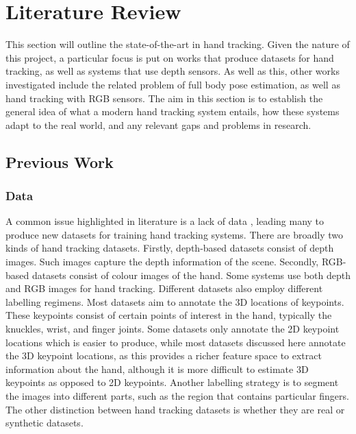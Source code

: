 \chapter{Literature Review}
\label{chap:lit}


This section will outline the state-of-the-art in hand tracking. Given the nature of this project, a particular focus is put on works that produce datasets for hand tracking, as well as systems that use depth sensors. As well as this, other works investigated include the related problem of full body pose estimation, as well as hand tracking with RGB sensors. The aim in this section is to establish the general idea of what a modern hand tracking system entails, how these systems adapt to the real world, and any relevant gaps and problems in research.

\section{Previous Work}
\subsection{Data}
A common issue highlighted in literature is a lack of data \cite{armagan2020measuring}, leading many to produce new datasets for training hand tracking systems. There are broadly two kinds of hand tracking datasets. Firstly, depth-based datasets consist of depth images. Such images capture the depth information of the scene. Secondly, RGB-based datasets consist of colour images of the hand. Some systems use both depth and RGB images for hand tracking. Different datasets also employ different labelling regimens. Most datasets aim to annotate the 3D locations of keypoints. These keypoints consist of certain points of interest in the hand, typically the knuckles, wrist, and finger joints. Some datasets only annotate the 2D keypoint locations which is easier to produce, while most datasets discussed here annotate the 3D keypoint locations, as this provides a richer feature space to extract information about the hand, although it is more difficult to estimate 3D keypoints as opposed to 2D keypoints. Another labelling strategy is to segment the images into different parts, such as the region that contains particular fingers. The other distinction between hand tracking datasets is whether they are real or synthetic datasets.


